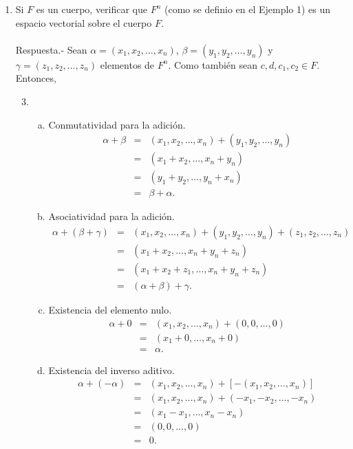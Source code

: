 \begin{enumerate}[\bfseries 1.]

    \item Si $F$ es un cuerpo, verificar que $F^n$ (como se definio en el Ejemplo 1) es un espacio vectorial sobre el cuerpo $F$.\\\\
	Respuesta.-\; Sean $\alpha=(x_1,x_2,\ldots,x_n)$,  $\beta=(y_1,y_2,\ldots,y_n)$ y $\gamma=(z_1,z_2,\ldots,z_n)$ elementos de $F^n$. Como también sean $c,d,c_1,c_2\in F$. Entonces,

	\begin{enumerate}[(1)]
	    \setcounter{enumii}{2}
	    \item 
		\begin{enumerate}[(a)]
		    \item Conmutatividad para la adición. 
			$$
			\begin{array}{rcl}
			    \alpha+\beta & = & (x_1,x_2,\ldots,x_n)+(y_1,y_2,\ldots, y_n) \\
			    & = & (x_1+x_2,\ldots,x_n+y_n)\\
			    & = & (y_1+y_2,\ldots,y_n+x_n)\\
			    & = & \beta+\alpha.
			\end{array}
			$$
		    \item Asociatividad para la adición.
			$$
			\begin{array}{rcl}
			    \alpha+(\beta+\gamma) & = & (x_1,x_2,\ldots,x_n)+(y_1,y_2,\ldots, y_n)+(z_1,z_2,\ldots,z_n) \\
			    & = & (x_1+x_2,\ldots,x_n+y_n+z_n)\\
			    & = & (x_1+x_2+z_1,\ldots,x_n+y_n+z_n)\\
			    & = & (\alpha+\beta)+\gamma.
			\end{array}
			$$
		    \item Existencia del elemento nulo.\\
			$$
			\begin{array}{rcl}
			    \alpha+0 & = & (x_1,x_2,\ldots,x_n)+(0,0,\ldots,0)\\
			    & = & (x_1+0,\ldots,x_n+0)\\
			    & = & \alpha.
			\end{array}
			$$
		    \item Existencia del inverso aditivo.
			$$
			\begin{array}{rcl}
			    \alpha+(-\alpha) & = & (x_1,x_2,\ldots,x_n)+\left[-(x_1,x_2,\ldots,x_n)\right]\\
			    & = & (x_1,x_2,\ldots,x_n)+(-x_1,-x_2,\ldots,-x_n)\\
			    & = & (x_1-x_1,\ldots,x_n-x_n)\\
			    & = & (0,0,\ldots,0)\\
			    & = & 0.
			\end{array}
			$$


\end{enumerate}
\end{enumerate}
\end{enumerate}
